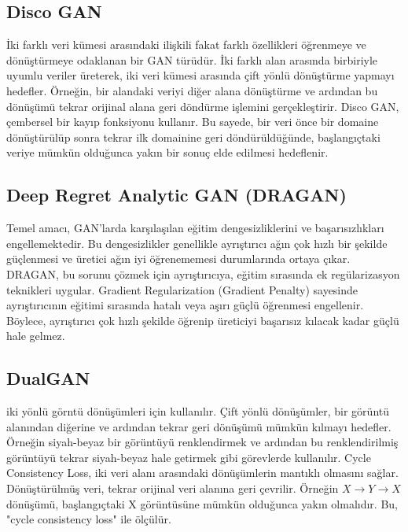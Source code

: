 \subsection{Disco GAN}

İki farklı veri kümesi arasındaki ilişkili fakat farklı özellikleri öğrenmeye ve dönüştürmeye odaklanan bir GAN türüdür. İki farklı alan arasında birbiriyle uyumlu veriler üreterek, iki veri kümesi arasında çift yönlü dönüştürme yapmayı hedefler. Örneğin, bir alandaki veriyi diğer alana dönüştürme ve ardından bu dönüşümü tekrar orijinal alana geri döndürme işlemini gerçekleştirir. Disco GAN, çembersel bir kayıp fonksiyonu kullanır. Bu sayede, bir veri önce bir domaine dönüştürülüp sonra tekrar ilk domainine geri döndürüldüğünde, başlangıçtaki veriye mümkün olduğunca yakın bir sonuç elde edilmesi hedeflenir.

\subsection{Deep Regret Analytic GAN (DRAGAN)}

Temel amacı, GAN'larda karşılaşılan eğitim dengesizliklerini ve başarısızlıkları engellemektedir. Bu dengesizlikler genellikle ayrıştırıcı ağın çok hızlı bir şekilde güçlenmesi ve üretici ağın iyi öğrenememesi durumlarında ortaya çıkar. DRAGAN, bu sorunu çözmek için ayrıştırıcıya, eğitim sırasında ek regülarizasyon teknikleri uygular.  Gradient Regularization (Gradient Penalty) sayesinde ayrıştırıcının eğitimi sırasında hatalı veya aşırı güçlü öğrenmesi engellenir. Böylece, ayrıştırıcı çok hızlı şekilde öğrenip üreticiyi başarısız kılacak kadar güçlü hale gelmez. 

\subsection{DualGAN}

iki yönlü görntü dönüşümleri için kullanılır. Çift yönlü dönüşümler, bir görüntü alanından diğerine ve ardından tekrar geri dönüşümü mümkün kılmayı hedefler. Örneğin siyah-beyaz bir görüntüyü renklendirmek ve ardından bu renklendirilmiş görüntüyü tekrar siyah-beyaz hale getirmek gibi görevlerde kullanılır. Cycle Consistency Loss, iki veri alanı arasındaki dönüşümlerin mantıklı olmasını sağlar. Dönüştürülmüş veri, tekrar orijinal veri alanına geri çevrilir. Örneğin $X \rightarrow Y \rightarrow X$ dönüşümü, başlangıçtaki X görüntüsüne mümkün olduğunca yakın olmalıdır. Bu, "cycle consistency loss" ile ölçülür.

